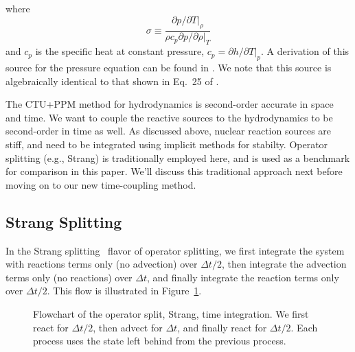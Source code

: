 \documentclass[times,preprint]{aastex631}
\begin{document}
where
\begin{equation}
\sigma \equiv \frac{\partial p/\partial T |_\rho}{\rho c_p \partial p/\partial \rho |_T}
\end{equation}
and $c_p$ is the specific heat at constant pressure, $c_p = \partial
h/\partial T |_p$.  A derivation of this source for the pressure
equation can be found in \cite{ABNZ:III}.  We note that this source is
algebraically identical to that shown in Eq.~25 of \cite{castro}.

The CTU+PPM method for hydrodynamics is second-order accurate in space
and time.  We want to couple the reactive sources to the hydrodynamics
to be second-order in time as well.  As discussed above, nuclear
reaction sources are stiff, and need to be integrated using implicit
methods for stabilty.  Operator splitting (e.g., Strang) is
traditionally employed here, and is used as a benchmark for comparison
in this paper.  We'll discuss this traditional approach next before moving
on to our new time-coupling method.



\subsection{Strang Splitting}

In the Strang splitting~\cite{strang:1968} flavor of operator splitting, we first integrate the system with reactions terms only (no advection)
over $\Delta t/2$, then integrate the advection terms only (no reactions) over $\Delta t$,
and finally integrate the reaction terms only over $\Delta t/2$.  This flow is illustrated
in Figure~\ref{fig:strang_flowchart}.

\begin{figure}[t]
  \caption{\label{fig:strang_flowchart} Flowchart of the operator split,
    Strang, time integration.  We first react for $\Delta t/2$, then
    advect for $\Delta t$, and finally react for $\Delta t/2$.  Each
    process uses the state left behind from the previous process.}
  \end{figure}
\end{document}
